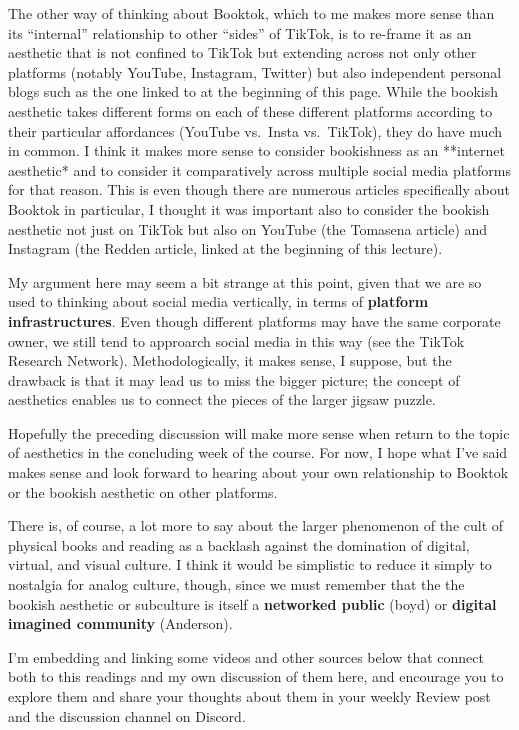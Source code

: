 \documentclass[
  letterpaper,
  DIV=11,
  numbers=noendperiod,
  oneside]{scrartcl}
\begin{document}
The other way of thinking about Booktok, which to me makes more sense
than its ``internal'' relationship to other ``sides'' of TikTok, is to
re-frame it as an aesthetic that is not confined to TikTok but extending
across not only other platforms (notably YouTube, Instagram, Twitter)
but also independent personal blogs such as the one linked to at the
beginning of this page. While the bookish aesthetic takes different
forms on each of these different platforms according to their particular
affordances (YouTube vs.~Insta vs.~TikTok), they do have much in common.
I think it makes more sense to consider bookishness as an **internet
aesthetic* and to consider it comparatively across multiple social media
platforms for that reason. This is even though there are numerous
articles specifically about Booktok in particular, I thought it was
important also to consider the bookish aesthetic not just on TikTok but
also on YouTube (the Tomasena article) and Instagram (the Redden
article, linked at the beginning of this lecture).

My argument here may seem a bit strange at this point, given that we are
so used to thinking about social media vertically, in terms of
\textbf{platform infrastructures}. Even though different platforms may
have the same corporate owner, we still tend to approarch social media
in this way (see the TikTok Research Network). Methodologically, it
makes sense, I suppose, but the drawback is that it may lead us to miss
the bigger picture; the concept of aesthetics enables us to connect the
pieces of the larger jigsaw puzzle.

Hopefully the preceding discussion will make more sense when return to
the topic of aesthetics in the concluding week of the course. For now, I
hope what I've said makes sense and look forward to hearing about your
own relationship to Booktok or the bookish aesthetic on other platforms.

There is, of course, a lot more to say about the larger phenomenon of
the cult of physical books and reading as a backlash against the
domination of digital, virtual, and visual culture. I think it would be
simplistic to reduce it simply to nostalgia for analog culture, though,
since we must remember that the the bookish aesthetic or subculture is
itself a \textbf{networked public} (boyd) or \textbf{digital imagined
community} (Anderson).

I'm embedding and linking some videos and other sources below that
connect both to this readings and my own discussion of them here, and
encourage you to explore them and share your thoughts about them in your
weekly Review post and the discussion channel on Discord.
\end{document}

